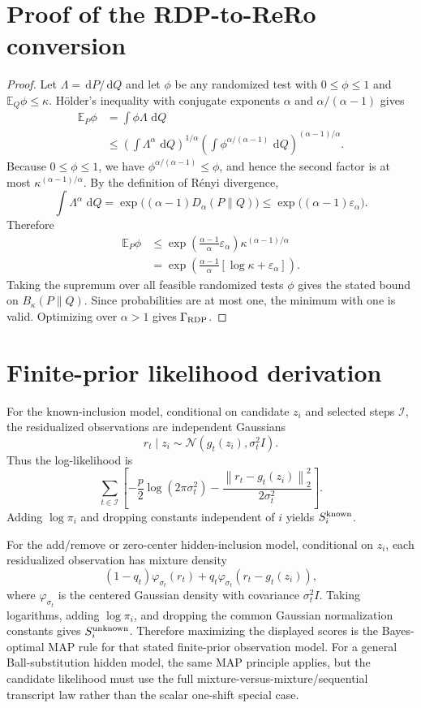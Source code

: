 \documentclass[conference,compsoc]{IEEEtran}
\newcommand{\N}{\mathcal{N}}
\newcommand{\E}{\mathbb{E}}
\newcommand{\dd}{\,\mathrm d}
\newcommand{\norm}[1]{\left\lVert #1\right\rVert}
\begin{document}
\section{Proof of the RDP-to-ReRo conversion}
\label{app:rdp-proof}

\begin{proof}
Let $\Lambda=\dd P/\dd Q$ and let $\phi$ be any randomized test with
$0\le\phi\le1$ and $\E_Q\phi\le\kappa$.  H\"older's inequality with conjugate
exponents $\alpha$ and $\alpha/(\alpha-1)$ gives
\begin{align*}
\E_P\phi
&=\int \phi\Lambda\,\dd Q\\
&\le
\left(\int \Lambda^\alpha\,\dd Q\right)^{1/\alpha}
\left(\int \phi^{\alpha/(\alpha-1)}\,\dd Q\right)^{(\alpha-1)/\alpha}.
\end{align*}
Because $0\le\phi\le1$, we have
$\phi^{\alpha/(\alpha-1)}\le\phi$, and hence the second factor is at most
$\kappa^{(\alpha-1)/\alpha}$.  By the definition of R\'enyi divergence,
\[
\int \Lambda^\alpha\,\dd Q
=
\exp\bigl((\alpha-1)D_\alpha(P\|Q)\bigr)
\le
\exp\bigl((\alpha-1)\varepsilon_\alpha\bigr).
\]
Therefore
\begin{align*}
\E_P\phi
&\le
\exp\left(\frac{\alpha-1}{\alpha}\varepsilon_\alpha\right)
\kappa^{(\alpha-1)/\alpha}\\
&=
\exp\left(
\frac{\alpha-1}{\alpha}
[\log\kappa+\varepsilon_\alpha]
\right).
\end{align*}
Taking the supremum over all feasible randomized tests $\phi$ gives the stated
bound on $B_\kappa(P\|Q)$.  Since probabilities are at most one, the minimum
with one is valid.  Optimizing over $\alpha>1$ gives $\Gamma_{\rm RDP}$.
\end{proof}

\section{Finite-prior likelihood derivation}
\label{app:finite-prior-proof}

For the known-inclusion model, conditional on candidate $z_i$ and selected
steps $\mathcal I$, the residualized observations are independent Gaussians
\[
r_t\mid z_i\sim\N(g_t(z_i),\sigma_t^2I).
\]
Thus the log-likelihood is
\[
\sum_{t\in\mathcal I}
\left[-\frac{p}{2}\log(2\pi\sigma_t^2)
-
\frac{\norm{r_t-g_t(z_i)}_2^2}{2\sigma_t^2}
\right].
\]
Adding $\log\pi_i$ and dropping constants independent of $i$ yields
$S_i^{\rm known}$.

For the add/remove or zero-center hidden-inclusion model, conditional on
$z_i$, each residualized observation has mixture density
\[
(1-q_t)\varphi_{\sigma_t}(r_t)
+
q_t\varphi_{\sigma_t}(r_t-g_t(z_i)),
\]
where $\varphi_{\sigma_t}$ is the centered Gaussian density with covariance
$\sigma_t^2I$.  Taking logarithms, adding $\log\pi_i$, and dropping the common
Gaussian normalization constants gives $S_i^{\rm unknown}$.  Therefore
maximizing the displayed scores is the Bayes-optimal MAP rule for that stated
finite-prior observation model.  For a general Ball-substitution hidden model,
the same MAP principle applies, but the candidate likelihood must use the full
mixture-versus-mixture/sequential transcript law rather than the scalar
one-shift special case.
\end{document}

